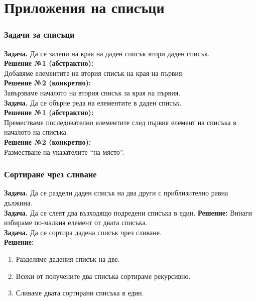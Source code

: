 \documentclass[alsotrans]{beamerswitch}
\begin{document}
\section{Приложения на списъци}

\begin{frame}
  \frametitle{Задачи за списъци}

  \textbf{Задача.} Да се залепи на края на даден списък втори даден списък.\\[2ex]
  \pause
  \textbf{Решение №1 (абстрактно):} \\
  Добавяме елементите на втория списък на края на първия.\\[2ex]
  \pause
  \textbf{Решение №2 (конкретно):} \\
  Завързваме началото на втория списък за края на първия.\\[2ex]
  \pause\pause
  \textbf{Задача.} Да се обърне реда на елементите в даден списък.\\[2ex]
  \pause
  \textbf{Решение №1 (абстрактно):}\\
  Преместваме последователно елементите след първия елемент на списъка в началото на списъка.\\[2ex]
  \pause
  \textbf{Решение №2 (конкретно):}\\
  Разместване на указателите ``на място''.
\end{frame}

\begin{frame}
  \frametitle{Сортиране чрез сливане}

  \textbf{Задача.} Да се раздели даден списък на два други с приблизително равна дължина.\\[2ex]
  \pause
  \textbf{Задача.} Да се слеят два възходящо подредени списъка в един.
  \pause
  \textbf{Решение:} Винаги избираме по-малкия елемент от двата списъка.\\[2ex]
  \pause
  \textbf{Задача.} Да се сортира дадена списък чрез сливане.\\
  \pause
  \textbf{Решение:}
  \begin{enumerate}
  \item Разделяме дадения списък на две.
  \item Всеки от получените два списъка сортираме рекурсивно.
  \item Сливаме двата сортирани списъка в един.
  \end{enumerate}
\end{frame}
\end{document}

